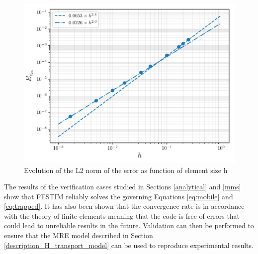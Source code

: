 \begin{figure}
    \centering
    \includegraphics[width=1\linewidth]{"Figures/Chapter3/L2 error on Cm vs h"}
    \caption{Evolution of the L2 norm of the error as function of element size h}
    \label{fig:error vs h}
\end{figure}

The results of the verification cases studied in Sections \ref{analytical} and \ref{mms} show that FESTIM reliably solves the governing Equations \ref{eq:mobile} and \ref{eq:trapped}.
It has also been shown that the convergence rate is in accordance with the theory of finite elements meaning that the code is free of errors that could lead to unreliable results in the future.
Validation can then be performed to ensure that the MRE model described in Section \ref{description_H_transport_model} can be used to reproduce experimental results.